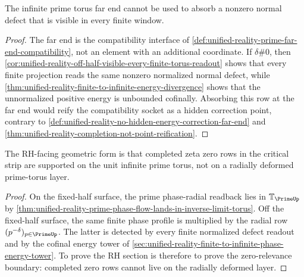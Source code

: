 \begin{corollary}
\label{cor:unified-reality-zeta-far-end-not-hidden-defect-absorber}
The infinite prime torus far end cannot be used to absorb a nonzero
normal defect that is visible in every finite window.
\end{corollary}

\begin{proof}
The far end is the compatibility interface of
\autoref{def:unified-reality-prime-far-end-compatibility}, not an element
with an additional coordinate.  If $\delta\#0$, then
\autoref{cor:unified-reality-off-half-visible-every-finite-torus-readout}
shows that every finite projection reads the same nonzero normalized
normal defect, while
\autoref{thm:unified-reality-finite-to-infinite-energy-divergence}
shows that the unnormalized positive energy is unbounded cofinally.
Absorbing this row at the far end would reify the compatibility socket as
a hidden correction point, contrary to
\autoref{def:unified-reality-no-hidden-energy-correction-far-end} and
\autoref{thm:unified-reality-completion-not-point-reification}.
\end{proof}

\begin{corollary}
\label{cor:unified-reality-rh-unit-infinite-torus-zero-boundary}
The RH-facing geometric form is that completed zeta zero rows in the
critical strip are supported on the unit infinite prime torus, not on a
radially deformed prime-torus layer.
\end{corollary}

\begin{proof}
On the fixed-half surface, the prime phase-radial readback lies in
$\mathbb T_{\PrimeUp}$ by
\autoref{thm:unified-reality-prime-phase-flow-lands-in-inverse-limit-torus}.
Off the fixed-half surface, the same finite phase profile is multiplied
by the radial row $(p^{-\delta})_{p\in\PrimeUp}$.  The latter is detected
by every finite normalized defect readout and by the cofinal energy tower
of
\autoref{sec:unified-reality-finite-to-infinite-phase-energy-tower}.  To
prove the RH section is therefore to prove the zero-relevance boundary:
completed zero rows cannot live on the radially deformed layer.
\end{proof}
